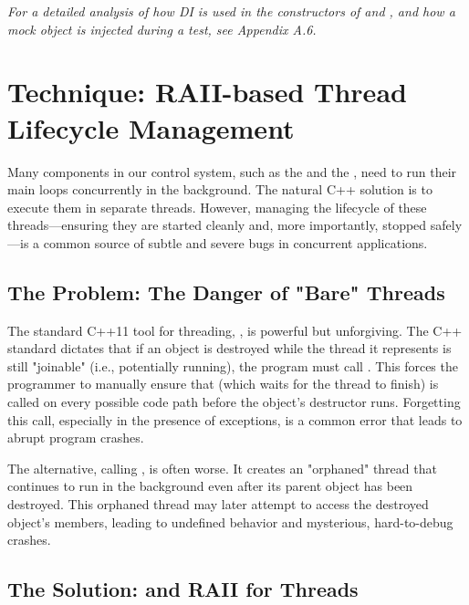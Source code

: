 \textit{For a detailed analysis of how DI is used in the constructors of  and , and how a mock object is injected during a test, see Appendix A.6.}



\section{Technique: RAII-based Thread Lifecycle Management}
\label{sec:technique_jthread_conceptual}

Many components in our control system, such as the  and the , need to run their main loops concurrently in the background. The natural C++ solution is to execute them in separate threads. However, managing the lifecycle of these threads—ensuring they are started cleanly and, more importantly, stopped safely—is a common source of subtle and severe bugs in concurrent applications.

\subsection{The Problem: The Danger of "Bare" Threads}
\label{subsec:danger_std_thread_conceptual}

The standard C++11 tool for threading, , is powerful but unforgiving. The C++ standard dictates that if an  object is destroyed while the thread it represents is still "joinable" (i.e., potentially running), the program must call . This forces the programmer to manually ensure that  (which waits for the thread to finish) is called on every possible code path before the object's destructor runs. Forgetting this call, especially in the presence of exceptions, is a common error that leads to abrupt program crashes.

The alternative, calling , is often worse. It creates an "orphaned" thread that continues to run in the background even after its parent object has been destroyed. This orphaned thread may later attempt to access the destroyed object's members, leading to undefined behavior and mysterious, hard-to-debug crashes.

\subsection{The Solution:  and RAII for Threads}
\label{subsec:solution_jthread_conceptual}

